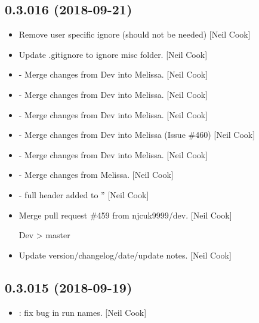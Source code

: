 \documentclass[a4paper,10pt,english]{report}
\begin{document}
\subsection{0.3.016 (2018-09-21)}
\label{\detokenize{misc/changelog:id315}}\begin{itemize}
\item {} 
Remove user specific ignore (should not be needed) {[}Neil Cook{]}

\item {} 
Update .gitignore to ignore misc folder. {[}Neil Cook{]}

\item {} 
 - Merge changes from Dev into Melissa. {[}Neil Cook{]}

\item {} 
 - Merge changes from Dev into Melissa. {[}Neil Cook{]}

\item {} 
 - Merge changes from Dev into Melissa. {[}Neil Cook{]}

\item {} 
 - Merge changes from Dev into Melissa (Issue \#460) {[}Neil
Cook{]}

\item {} 
 - Merge changes from Dev into Melissa. {[}Neil
Cook{]}

\item {} 
 - Merge changes from Melissa. {[}Neil Cook{]}

\item {} 
 - full header added to ” {[}Neil
Cook{]}

\item {} 
Merge pull request \#459 from njcuk9999/dev. {[}Neil Cook{]}

Dev \textendash{}\textgreater{} master

\item {} 
Update version/changelog/date/update notes. {[}Neil Cook{]}

\end{itemize}


\subsection{0.3.015 (2018-09-19)}
\label{\detokenize{misc/changelog:id316}}\begin{itemize}
\item {} 
: fix bug in run names. {[}Neil Cook{]}

\end{itemize}
\end{document}
